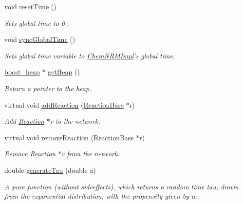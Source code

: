 \begin{DoxyCompactItemize}
void \hyperlink{classchem_1_1ChemNRMImpl_abc38c43b16a4ab1aa31505152e4426ed}{reset\-Time} ()
\begin{DoxyCompactList}\small\item\em Sets global time to 0.. \end{DoxyCompactList}\item 
void \hyperlink{classchem_1_1ChemNRMImpl_ad096a21196bb3e5a978dc3fdb50d8e1b}{sync\-Global\-Time} ()
\begin{DoxyCompactList}\small\item\em Sets global time variable to \hyperlink{classchem_1_1ChemNRMImpl}{Chem\-N\-R\-M\-Impl}'s global time. \end{DoxyCompactList}\item 
\hyperlink{namespacechem_ad3c7e19583b71f442e2d969972ed21f9}{boost\-\_\-heap} $\ast$ \hyperlink{classchem_1_1ChemNRMImpl_ae52572d35469dd8569457dbce96af78e}{get\-Heap} ()
\begin{DoxyCompactList}\small\item\em Return a pointer to the heap. \end{DoxyCompactList}\item 
virtual void \hyperlink{classchem_1_1ChemNRMImpl_afdd66d28d760064d5edc4472b8146a08}{add\-Reaction} (\hyperlink{classchem_1_1ReactionBase}{Reaction\-Base} $\ast$r)
\begin{DoxyCompactList}\small\item\em Add \hyperlink{classchem_1_1Reaction}{Reaction} $\ast$r to the network. \end{DoxyCompactList}\item 
virtual void \hyperlink{classchem_1_1ChemNRMImpl_a529cafc541d6eb933a6c1bf5869e2d45}{remove\-Reaction} (\hyperlink{classchem_1_1ReactionBase}{Reaction\-Base} $\ast$r)
\begin{DoxyCompactList}\small\item\em Remove \hyperlink{classchem_1_1Reaction}{Reaction} $\ast$r from the network. \end{DoxyCompactList}\item 
double \hyperlink{classchem_1_1ChemNRMImpl_a196f525d2e2392c0531f763fd8169701}{generate\-Tau} (double a)
\begin{DoxyCompactList}\small\item\em A pure function (without sideeffects), which returns a random time tau, drawn from the exponential distribution, with the propensity given by a. \end{DoxyCompactList}\item 

\end{DoxyCompactItemize}
